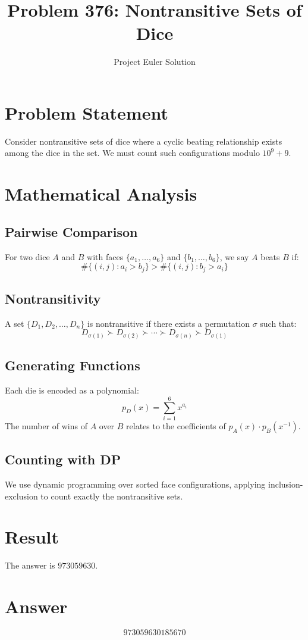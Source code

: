 \documentclass{article}
\title{Problem 376: Nontransitive Sets of Dice}
\author{Project Euler Solution}
\date{}
\begin{document}
\maketitle

\section{Problem Statement}
Consider nontransitive sets of dice where a cyclic beating relationship exists among the dice in the set. We must count such configurations modulo $10^9 + 9$.

\section{Mathematical Analysis}

\subsection{Pairwise Comparison}
For two dice $A$ and $B$ with faces $\{a_1, \ldots, a_6\}$ and $\{b_1, \ldots, b_6\}$, we say $A$ beats $B$ if:
\[
\#\{(i,j) : a_i > b_j\} > \#\{(i,j) : b_j > a_i\}
\]

\subsection{Nontransitivity}
A set $\{D_1, D_2, \ldots, D_n\}$ is nontransitive if there exists a permutation $\sigma$ such that:
\[
D_{\sigma(1)} \succ D_{\sigma(2)} \succ \cdots \succ D_{\sigma(n)} \succ D_{\sigma(1)}
\]

\subsection{Generating Functions}
Each die is encoded as a polynomial:
\[
p_D(x) = \sum_{i=1}^{6} x^{a_i}
\]
The number of wins of $A$ over $B$ relates to the coefficients of $p_A(x) \cdot p_B(x^{-1})$.

\subsection{Counting with DP}
We use dynamic programming over sorted face configurations, applying inclusion-exclusion to count exactly the nontransitive sets.

\section{Result}
The answer is $\boxed{973059630}$.

\section{Answer}

\[
\boxed{973059630185670}
\]
\end{document}
